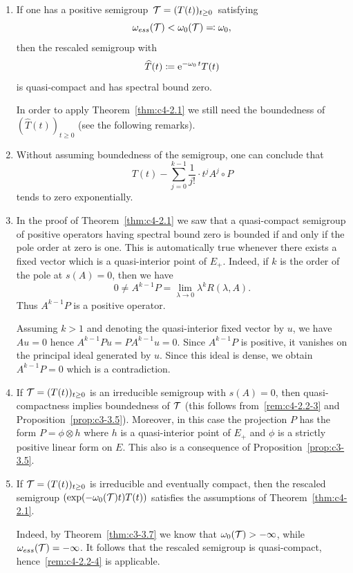 \begin{remarks}\label{rem:c4-2.2}
\begin{enumerate}[\upshape (i), wide, labelindent=.25em]

\item \label{rem:c4-2.2-1}
If one has a positive semigroup\, $\TT = (T(t))_{t \geq 0}$\,  satisfying
\[
\omega_{ess}(\mathcal{T}) <  \omega_0(\mathcal{T}) \eqqcolon \omega_0, 
\]
then the rescaled semigroup with 
\[
\widehat{T}(t) \coloneq \mathrm{e}^{-\omega_0 \, t }T(t)
\]
is quasi-compact and has spectral bound zero.

In order to apply Theorem~\ref{thm:c4-2.1} we still need the boundedness of\/ $(\widehat{T}(t))_{t\geq 0}$ (see the following remarks).

\item \label{rem:c4-2.2-2}
Without assuming boundedness of the semigroup, one can conclude that
\[
T(t) - \sum_{j=0}^{k-1} \frac{1}{j!} \cdot t^{j}A^{j}{\circ}P
\]
tends to zero exponentially.

\item \label{rem:c4-2.2-3}
In the proof of Theorem~\ref{thm:c4-2.1} we saw that a quasi-compact semigroup of positive operators having spectral bound zero is bounded if and only if the pole order at zero is one.
This is automatically true whenever there exists a fixed vector which is a quasi-interior point of\/ $E_{+}$.
Indeed, if\/ $k$ is the order of the pole at $s(A) = 0$, then we have 
\[
0 \neq A^{k-1}P = \lim_{\lambda \to 0} \lambda^{k}R(\lambda,A).
\]
Thus $A^{k-1}P$ is a positive operator.

Assuming $k > 1$ and denoting the quasi-interior fixed vector by $u$, we have $Au = 0$ hence $A^{k-1}Pu = PA^{k-1}u = 0$.
Since $A^{k-1}P$ is positive, it vanishes on the principal ideal generated by $u$.
Since this ideal is dense, we obtain $A^{k-1}P = 0$ which is a contradiction.

\item  \label{rem:c4-2.2-4}
If\/ $\TT = (T(t))_{t \geq 0}$ is an irreducible semigroup with $s(A) = 0$, then quasi-compactness implies boundedness of\/ $\mathcal{T}$ (this follows from~\ref{rem:c4-2.2-3} and Proposition~\ref{prop:c3-3.5}).
Moreover, in this case the projection $P$ has the form $P = \phi \otimes h$ where $h$ 
is a quasi-interior point of\/ $E_{+}$ and $\phi$ is a strictly positive linear form on $E$.
This also is a consequence of Proposition~\ref{prop:c3-3.5}.

\item  \label{rem:c4-2.2-5}
If\/ $\TT = (T(t))_{t \geq 0}$ is irreducible and eventually compact, then the rescaled semigroup $(\exp(-\omega_0(\mathcal{T})t)T(t))$ satisfies the assumptions of Theorem~\ref{thm:c4-2.1}.

Indeed, by Theorem~\ref{thm:c3-3.7} we know that $\omega_0(\mathcal{T}) > -\infty$, while $\omega_{ess}(\mathcal{T}) = -\infty$.
It follows that the rescaled semigroup is quasi-compact, hence~\ref{rem:c4-2.2-4} is applicable.
\end{enumerate}
\end{remarks}
